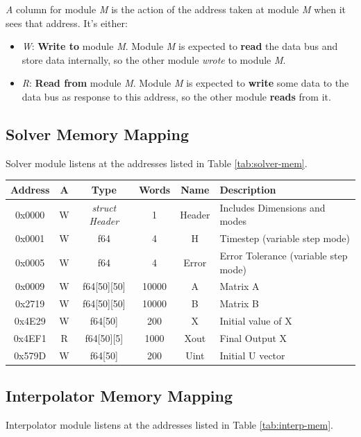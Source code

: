 \documentclass[12pt]{report}
\begin{document}
\emph{A} column for module \emph{M} is the action of the address taken at module \emph{M} when it sees that address. It's either:

\begin{itemize}
    \item \emph{W}: \textbf{Write to} module \emph{M}. Module \emph{M} is expected to \textbf{read} the data bus and store data internally, so the other module \emph{wrote} to module \emph{M}.
    \item \emph{R}: \textbf{Read from} module \emph{M}. Module \emph{M} is expected to \textbf{write} some data to the data bus as response to this address, so the other module \textbf{reads} from it.
\end{itemize}

\subsection{Solver Memory Mapping}
Solver module listens at the addresses listed in Table \ref{tab:solver-mem}.

\begin{center}
 \begin{tabular}{||c| c| c| c| c| l||} 
 \hline
 Address & A & Type & Words & Name & Description  \\ [0.5ex] 
 \hline\hline
  0x0000 & W & \emph{struct Header} & 1 & Header & Includes Dimensions and modes  \\ 
 \hline
 0x0001  & W & f64 & 4 & H & Timestep (variable step mode)  \\
 \hline
 0x0005  & W & f64 & 4 & Error & Error Tolerance (variable step mode) \\
 \hline
 0x0009  & W & f64[50][50] & 10000 & A & Matrix A \\
 \hline
 0x2719  & W & f64[50][50] & 10000 & B & Matrix B \\
 \hline
 0x4E29  & W & f64[50] & 200 & X & Initial value of X \\
 \hline
 0x4EF1  & R & f64[50][5] & 1000 & Xout & Final Output X \\ [1ex] 
 \hline
 0x579D  & W & f64[50] & 200 & Uint & Initial U vector \\
 \hline
\end{tabular}
\end{center}

\subsection{Interpolator Memory Mapping}
Interpolator module listens at the addresses listed in Table \ref{tab:interp-mem}.
\end{document}
